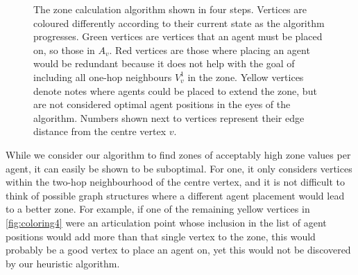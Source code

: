 \begin{figure}
  \caption{The zone calculation algorithm shown in four steps.
           Vertices are coloured differently according to their current state as the algorithm progresses.
           Green vertices are vertices that an agent must be placed on, so those in $A_v$.
           Red vertices are those where placing an agent would be redundant because it does not help with the goal of including all one-hop neighbours $V_v^1$ in the zone.
           Yellow vertices denote notes where agents could be placed to extend the zone, but are not considered optimal agent positions in the eyes of the algorithm.
           Numbers shown next to vertices represent their edge distance from the centre vertex $v$.}
  \label{fig:coloring}
\end{figure}
While we consider our algorithm to find zones of acceptably high zone values per agent, it can easily be shown to be suboptimal.
For one, it only considers vertices within the two-hop neighbourhood of the centre vertex, and it is not difficult to think of possible graph structures where a different agent placement would lead to a better zone.
For example, if one of the remaining yellow vertices in \autoref{fig:coloring4} were an articulation point whose inclusion in the list of agent positions would add more than that single vertex to the zone, this would probably be a good vertex to place an agent on, yet this would not be discovered by our heuristic algorithm.
